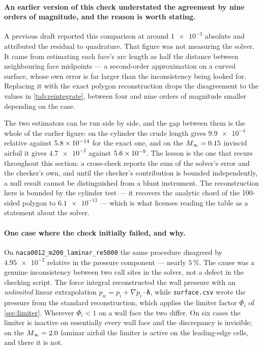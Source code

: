 \paragraph{An earlier version of this check understated the agreement by nine orders of
magnitude, and the reason is worth stating.} A previous draft reported this comparison at
around $\num{1e-3}$ absolute and attributed the residual to quadrature. That figure was
not measuring the solver. It came from estimating each face's arc length as half the
distance between neighbouring face midpoints --- a second-order approximation on a curved
surface, whose own error is far larger than the inconsistency being looked for. Replacing
it with the exact polygon reconstruction drops the disagreement to the values in
\cref{tab:reintegrate}, between four and nine orders of magnitude smaller depending on the
case.

The two estimators can be run side by side, and the gap between them is the whole of the
earlier figure: on the cylinder the crude length gives $\num{9.9e-4}$ relative against
$\num{5.8e-14}$ for the exact one, and on the $M_\infty=0.15$ inviscid airfoil it
gives $\num{4.7e-2}$ against $\num{5.6e-09}$. The lesson is the one that recurs
throughout this section: a cross-check reports the sum of the solver's error and the
checker's own, and until the checker's contribution is bounded independently, a null result
cannot be distinguished from a blunt instrument. The reconstruction here is bounded by the
cylinder test --- it recovers the analytic chord of the 100-sided polygon to
$\num{6.1e-13}$ --- which is what licenses reading the table as a statement about the
solver.

\paragraph{One case where the check initially failed, and why.} On
\texttt{naca0012\_m200\_laminar\_re5000} the same procedure disagreed by
$\num{4.95e-2}$ relative in the pressure component --- nearly $5\,\%$. The cause was a
genuine
inconsistency between two call sites in the solver, not a defect in the checking
script. The force integral reconstructed the wall pressure with an \emph{unlimited}
linear extrapolation $p_w = p_i + \nabla p_i\cdot\boldsymbol{\delta}$, while
\texttt{surface.csv} wrote the pressure from the standard reconstruction, which
applies the limiter factor $\Phi_i$ of \cref{sec:limiter}. Wherever $\Phi_i<1$ on a
wall face the two differ. On six cases the limiter is inactive on essentially every
wall face and the discrepancy is invisible; on the $M_\infty=2.0$ laminar airfoil the
limiter is active on the leading-edge cells, and there it is not.

